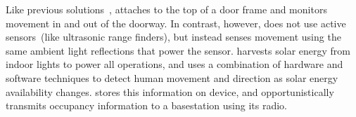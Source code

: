 Like previous solutions~\cite{hnat2012doorjamb}, \sysname attaches to the top of a door frame and monitors movement in and out of the doorway.
In contrast, however, \sysname does not use active sensors~(like ultrasonic range finders), but instead senses movement using the same ambient light reflections that power the sensor.
\sysname harvests solar energy from indoor lights to power all operations, and uses a combination of hardware and software techniques to detect human movement and direction as solar energy availability changes.
\sysname stores this information on device, and opportunistically transmits occupancy information to a basestation using its radio.





